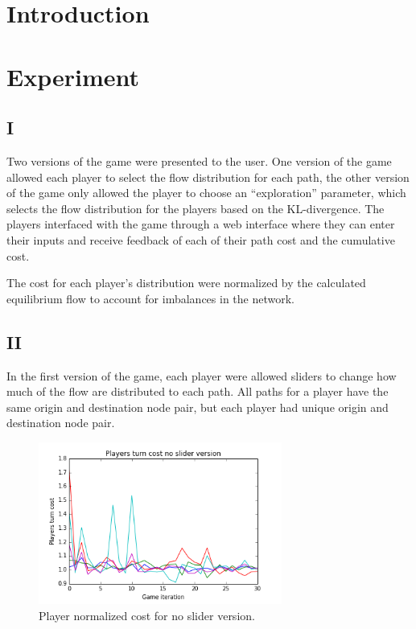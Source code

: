 \documentclass{sig-alternate-ipsn13}
\begin{document}
\section{Introduction}



\section{Experiment}

\subsection{I}

Two versions of the game were presented to the user. One version of the game allowed each player to select the flow distribution for each path, the other version of the game only allowed the player to choose an ``exploration'' parameter, which selects the flow distribution for the players based on the KL-divergence.
The players interfaced with the game through a web interface where they can enter their inputs and receive feedback of each of their path cost and the cumulative cost.


The cost for each player's distribution were normalized by the calculated equilibrium flow to account for imbalances in the network.


\subsection{II}
In the first version of the game, each player were allowed sliders to change how much of the flow are distributed to each path. All paths for a player have the same origin and destination node pair, but each player had unique origin and destination node pair.

\begin{figure}
  \centering
  \includegraphics[width=80mm]{images/no_slider_players_costs.png}
  \caption{Player normalized cost for no slider version.}
  \label{fig:cost_no_slider}
\end{figure}
\end{document}
